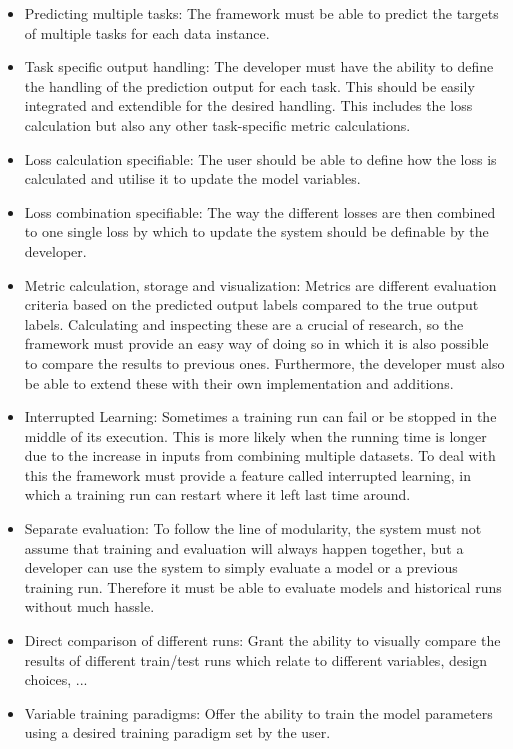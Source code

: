 \begin{itemize}

	\item Predicting multiple tasks: The framework must be able to predict the targets of multiple tasks for each data instance. 
	\item Task specific output handling: The developer must have the ability to define the handling of the prediction output for each task. This should be easily integrated and extendible for the desired handling. This includes the loss calculation but also any other task-specific metric calculations.
	\item Loss calculation specifiable: The user should be able to define how the loss is calculated and utilise it to update the model variables.
	\item Loss combination specifiable: The way the different losses are then combined to one single loss by which to update the system should be definable by the developer.
	\item Metric calculation, storage and visualization: Metrics are different evaluation criteria based on the predicted output labels compared to the true output labels. Calculating and inspecting these are a crucial of research, so the framework must provide an easy way of doing so in which it is also possible to compare the results to previous ones. Furthermore, the developer must also be able to extend these with their own implementation and additions.
	\item Interrupted Learning: Sometimes a training run can fail or be stopped in the middle of its execution. This is more likely when the running time is longer due to the increase in inputs from combining multiple datasets. To deal with this the framework must provide a feature called interrupted learning, in which a training run can restart where it left last time around.
	\item Separate evaluation: To follow the line of modularity, the system must not assume that training and evaluation will always happen together, but a developer can use the system to simply evaluate a model or a previous training run. Therefore it must be able to evaluate models and historical runs without much hassle.
	\item Direct comparison of different runs: Grant the ability to visually compare the results of different train/test runs which relate to different variables, design choices, ...
	\item Variable training paradigms: Offer the ability to train the model parameters using a desired training paradigm set by the user.
\end{itemize}

